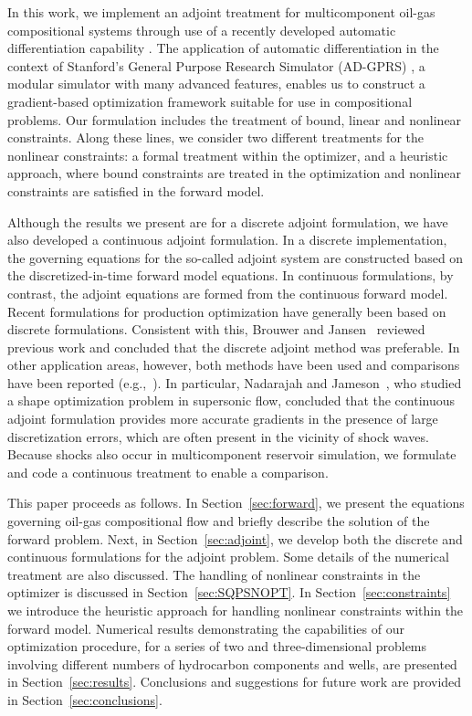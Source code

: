 \documentclass[twocolumn,numbook]{svjour3}          %
\begin{document}
In this work, we implement an adjoint treatment for multicomponent oil-gas
compositional systems through use of a recently developed automatic
differentiation capability \cite{Younis:2010}. The application of automatic
differentiation in the context of Stanford's General Purpose Research Simulator
(AD-GPRS) \cite{Cao:Thesis}, a modular simulator with many advanced features,
enables us to construct a gradient-based optimization framework suitable for
use in compositional problems. Our formulation includes the treatment of
bound, linear and nonlinear constraints. Along these lines, we consider two
different treatments for the nonlinear constraints: a formal treatment within
the optimizer, and a heuristic approach, where bound constraints are treated in the optimization and nonlinear constraints are satisfied in the forward model.


Although the results we present are for a discrete adjoint formulation,
we have also developed a continuous adjoint formulation. In a discrete
implementation, the governing equations for the so-called adjoint
system are constructed based on the discretized-in-time forward model
equations. In continuous formulations, by contrast, the adjoint
equations are formed from the continuous forward model. Recent
formulations for production optimization have generally been based on
discrete formulations. Consistent with this, Brouwer and Jansen~\cite{Brouwer:2004}
reviewed previous work and concluded that the discrete adjoint method
was preferable. In other application areas, however, both methods have
been used and comparisons have been reported
(e.g.,~\cite{Jameson:2007,Asouti:2008}). In particular, Nadarajah and
Jameson~\cite{Jameson:2007}, who studied a shape optimization problem
in supersonic flow, concluded that the continuous adjoint formulation
provides more accurate gradients in the presence of large
discretization errors, which are often present in the vicinity of shock
waves. Because shocks also occur in multicomponent reservoir simulation, we
formulate and code a continuous treatment to enable a comparison.

This paper proceeds as follows. In Section~\ref{sec:forward}, we present the
equations governing oil-gas compositional flow and briefly describe the solution
of the forward problem. Next, in Section~\ref{sec:adjoint}, we develop both the
discrete and continuous formulations for the adjoint problem. Some details of
the numerical treatment are also discussed. The handling of nonlinear
constraints in the optimizer is discussed in Section~\ref{sec:SQPSNOPT}.
In Section~\ref{sec:constraints} we introduce the heuristic approach for handling nonlinear constraints within the forward model. Numerical results
demonstrating the capabilities of our optimization procedure, for a series of
two and three-dimensional problems involving different numbers of
hydrocarbon components and wells, are presented in Section~\ref{sec:results}.
Conclusions and suggestions for future work are provided in
Section~\ref{sec:conclusions}.
\end{document}
